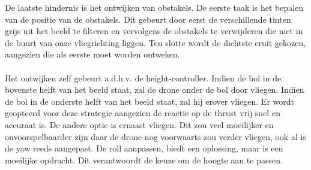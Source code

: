 \noindent
De laatste hindernis is het ontwijken van obstakels. De eerste taak is het bepalen van de positie van de obstakels. Dit gebeurt door eerst de verschillende tinten grijs uit het beeld te filteren en vervolgens de obstakels te verwijderen die niet in de buurt van onze vliegrichting liggen. Ten slotte wordt de dichtste eruit gekozen, aangezien die als eerste moet worden ontweken.
\\
\\
Het ontwijken zelf gebeurt a.d.h.v. de height-controller. Indien de bol in de bovenste helft van het beeld staat, zal de drone onder de bol door vliegen. Indien de bol in de onderste helft van het beeld staat, zal hij erover vliegen. Er wordt geopteerd voor deze strategie aangezien de reactie op de thrust vrij snel en accuraat is. De andere optie is ernaast vliegen. Dit zou veel moeilijker en onvoorspelbaarder zijn daar de drone nog voorwaarts zou verder vliegen, ook al is de yaw reeds aangepast. De roll aanpassen, biedt een oplossing, maar is een moeilijke opdracht. Dit verantwoordt de keuze om de hoogte aan te passen.